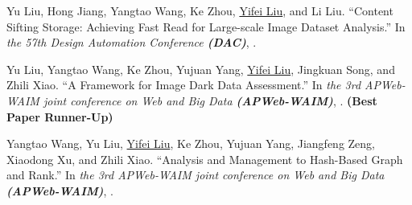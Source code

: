\documentclass[a4paper,10pt,oneside]{article}
\begin{document}
\begin{body}

\NumberedItem{[5]}
Yu Liu, Hong Jiang, Yangtao Wang, Ke Zhou, \underline{Yifei Liu}, and Li Liu.
``Content Sifting Storage: Achieving Fast Read for Large-scale Image Dataset Analysis.''
In \textit{the 57th Design Automation Conference \textbf{(DAC)}}, %
.


\NumberedItem{[6]}
Yu Liu, Yangtao Wang, Ke Zhou, Yujuan Yang, \underline{Yifei Liu}, Jingkuan Song, and Zhili Xiao.
``A Framework for Image Dark Data Assessment.''
In \textit{the 3rd APWeb-WAIM joint conference on Web and Big Data \textbf{(APWeb-WAIM)}}, %
. \textbf{(Best Paper Runner-Up)}


\NumberedItem{[7]}
Yangtao Wang, Yu Liu, \underline{Yifei Liu}, Ke Zhou, Yujuan Yang, Jiangfeng Zeng, Xiaodong Xu, and Zhili Xiao.
``Analysis and Management to Hash-Based Graph and Rank.''
In \textit{the 3rd APWeb-WAIM joint conference on Web and Big Data \textbf{(APWeb-WAIM)}}, %
. 








\end{body}
\end{document}

